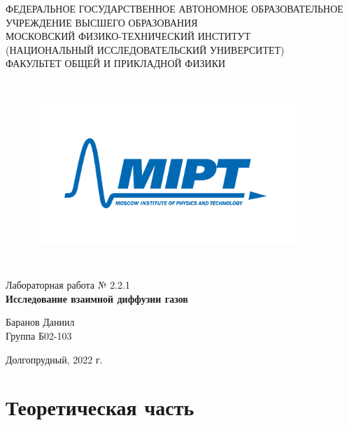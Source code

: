 \documentclass[a4paper,12pt]{article} %
\begin{document}
\begin{center}
	\footnotesize{ФЕДЕРАЛЬНОЕ ГОСУДАРСТВЕННОЕ АВТОНОМНОЕ ОБРАЗОВАТЕЛЬНОЕ 			УЧРЕЖДЕНИЕ ВЫСШЕГО ОБРАЗОВАНИЯ}\\
	\footnotesize{МОСКОВСКИЙ ФИЗИКО-ТЕХНИЧЕСКИЙ ИНСТИТУТ\\(НАЦИОНАЛЬНЫЙ 			ИССЛЕДОВАТЕЛЬСКИЙ УНИВЕРСИТЕТ)}\\
	\footnotesize{ФАКУЛЬТЕТ ОБЩЕЙ И ПРИКЛАДНОЙ ФИЗИКИ\\}
	\hfill \break
	\hfill \break
	\hfill \break
	\hfill \break
\end{center}


\begin{figure}[h]
    \centering
    \includegraphics*[width=10cm,height=7cm,keepaspectratio]{mipt_eng_text_png.png}
    \label{fig:my_label}
\end{figure}


\begin{center}   
    \hfill \break
	\hfill \break
	\hfill \break
	\hfill \break
	\large{Лабораторная работа № 2.2.1\\\textbf{Исследование взаимной диффузии газов}}\\
	\hfill \break
	\hfill \break
	\hfill \break
	\hfill \break
	\begin{flushright}
		Баранов Даниил\\
		Группа Б02-103
	\end{flushright}
	\hfill \break
	\hfill \break
	\hfill \break
\end{center}
\hfill \break
\hfill \break
\hfill \break
\hfill \break
\begin{center}
	Долгопрудный, 2022 г.
\end{center}
\thispagestyle{empty}



\newpage
\section{Теоретическая часть}
\end{document}
